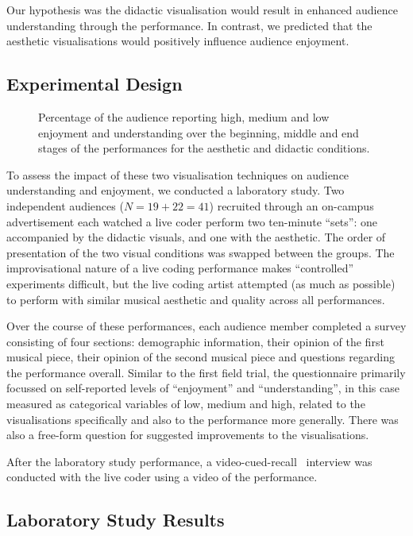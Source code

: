 \documentclass{sig-alternate}
\begin{document}
Our hypothesis was the didactic visualisation would result in enhanced
audience understanding through the performance. In contrast, we
predicted that the aesthetic visualisations would positively influence
audience enjoyment.

\subsection{Experimental Design}

\begin{figure*}
\centering
{}
\caption{Percentage of the audience reporting high, medium and low
enjoyment and understanding over the beginning, middle and end stages
of the performances for the aesthetic and didactic conditions.}
\label{fig:enjoyment-understanding}
\end{figure*}

To assess the impact of these two visualisation techniques on audience
understanding and enjoyment, we conducted a laboratory study. Two
independent audiences ($N=19+22=41$) recruited through an on-campus
advertisement each watched a live coder perform two ten-minute
``sets'': one accompanied by the didactic visuals, and one with the
aesthetic. The order of presentation of the two visual conditions was
swapped between the groups. The improvisational nature of a live
coding performance makes ``controlled'' experiments difficult, but the
live coding artist attempted (as much as possible) to perform with
similar musical aesthetic and quality across all performances.

Over the course of these performances, each audience member completed
a survey consisting of four sections: demographic information, their
opinion of the first musical piece, their opinion of the second
musical piece and questions regarding the performance overall. Similar
to the first field trial, the questionnaire primarily focussed on
self-reported levels of ``enjoyment'' and ``understanding'', in this
case measured as categorical variables of low, medium and high,
related to the visualisations specifically and also to the performance
more generally. There was also a free-form question for suggested
improvements to the visualisations.

After the laboratory study performance, a
video-cued-recall~\cite{Suchman:1992tk} interview was conducted with
the live coder using a video of the performance.

\subsection{Laboratory Study Results}
\end{document}
